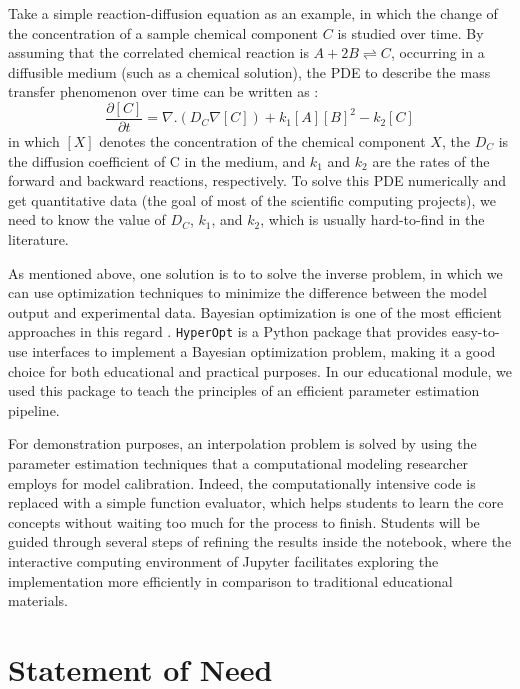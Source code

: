Take a simple reaction-diffusion equation as an example, in which the change of the concentration of a sample chemical component $C$ is studied over time. By assuming that the correlated chemical reaction is $A + 2B \rightleftharpoons C$, occurring in a diffusible medium (such as a chemical solution), the PDE to describe the mass transfer phenomenon over time can be written as \cite{Grindrod1996}:
\begin{equation}
\frac{\partial [C]}{\partial t} = \nabla . \left( D_C \nabla [C] \right) + k_1 [A][B]^2 - k_2 [C] 
\end{equation}
in which $[X]$ denotes the concentration of the chemical component $X$, the $D_C$ is the diffusion coefficient of C in the medium, and $k_1$ and $k_2$ are the rates of the forward and backward reactions, respectively. To solve this PDE numerically and get quantitative data (the goal of most of the scientific computing projects), we need to know the value of $D_C$, $k_1$, and $k_2$, which is usually hard-to-find in the literature.

As mentioned above, one solution is to to solve the inverse problem, in which we can use optimization techniques to minimize the difference between the model output and experimental data. Bayesian optimization is one of the most efficient approaches in this regard \cite{Mockus1989}. \texttt{HyperOpt} \cite{Bergstra2013} is a Python package that provides easy-to-use interfaces to implement a Bayesian optimization problem, making it a good choice for both educational and practical purposes. In our educational module, we used this package to teach the principles of an efficient parameter estimation pipeline.

For demonstration purposes, an interpolation problem is solved by using the parameter estimation techniques that a computational modeling researcher employs for model calibration. Indeed, the computationally intensive code is replaced with a simple function evaluator, which helps students to learn the core concepts without waiting too much for the process to finish. Students will be guided through several steps of refining the results inside the notebook, where the interactive computing environment of Jupyter facilitates exploring the implementation more efficiently in comparison to traditional educational materials.

\section{Statement of Need}

